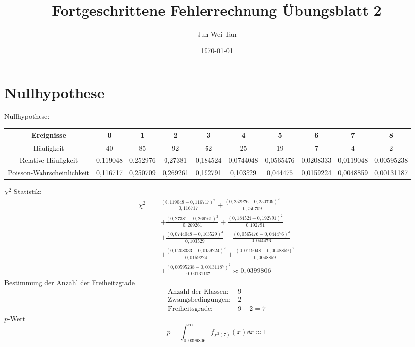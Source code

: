 \documentclass[prb,12pt]{revtex4-2}
\theoremstyle{definition}
\theoremstyle{definition}
\begin{document}
\title{Fortgeschrittene Fehlerrechnung Übungsblatt 2}
	\author{Jun Wei Tan}
	\date{\today}
	\maketitle


\section{Nullhypothese}
Nullhypothese: 
\begin{table}[h]
	{\scriptsize
\begin{tabular}{cccccccccc}
	\toprule
	\textbf{Ereignisse} & 0 & 1 & 2 & 3 & 4 & 5 & 6 & 7 & 8 \\\midrule
H\"{a}ufigkeit & 40 & 85 & 92 & 62 & 25 & 19 & 7 & 4 & 2 \\\midrule
Relative H\"{a}ufigkeit & 0,119048 & 0,252976 & 0,27381 & 0,184524 & 0,0744048 & 0,0565476 & 0,0208333 & 0,0119048 & 0,00595238 \\\midrule
Poisson-Wahrscheinlichkeit & 0,116717 & 0,250709 & 0,269261 & 0,192791 & 0,103529 & 0,044476 & 0,0159224 & 0,0048859 & 0,00131187 \\\bottomrule
\end{tabular}
}
\end{table}

$\chi^2$ Statistik:
\begin{align*}
	\chi^2 =& \frac{(0,119048 - 0,116717)^2}{0,116717}+\frac{(0,252976 - 0,250709)^2}{0,250709}\\&+\frac{(0,27381 - 0,269261)^2}{0,269261}+\frac{(0,184524 - 0,192791)^2}{0,192791}\\&+\frac{(0,0744048 - 0,103529)^2}{0,103529}+\frac{(0,0565476 - 0,044476)^2}{0,044476}\\&+\frac{(0,0208333 - 0,0159224)^2}{0,0159224}+\frac{(0,0119048 - 0,0048859)^2}{0,0048859}\\&+\frac{(0,00595238 - 0,00131187)^2}{0,00131187}\approx 0,0399806
\end{align*}
Bestimmung der Anzahl der Freiheitzgrade
\begin{align*}
\text{Anzahl der Klassen}:&~9\\
\text{Zwangsbedingungen}:&~2\\
\text{Freiheitsgrade}:&~9-2=7
\end{align*}
$p$-Wert
\[p=\int_{0,0399806}^\infty f_{\chi^2(7)}(x) \dd{x}\approx 1\]
\end{document}

